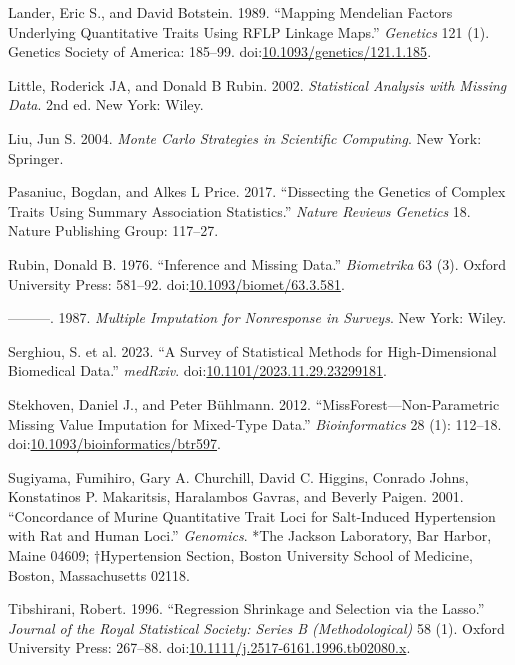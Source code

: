 \documentclass[
  12pt,
]{article}
\newlength{\cslhangindent}
\newlength{\cslentryspacingunit} %
\newenvironment{CSLReferences}[2] %
 {%
  \setlength{\parindent}{0pt}
  \ifodd #1
  \let\oldpar\par
  \def\par{\hangindent=\cslhangindent\oldpar}
  \fi
  \setlength{\parskip}{#2\cslentryspacingunit}
 }%
 {}
\begin{document}
\begin{CSLReferences}{1}{0}
\leavevmode{}%
Lander, Eric S., and David Botstein. 1989. {``Mapping Mendelian Factors
Underlying Quantitative Traits Using RFLP Linkage Maps.''}
\emph{Genetics} 121 (1). Genetics Society of America: 185--99.
doi:\href{https://doi.org/10.1093/genetics/121.1.185}{10.1093/genetics/121.1.185}.

\leavevmode{}%
Little, Roderick JA, and Donald B Rubin. 2002. \emph{Statistical
Analysis with Missing Data}. 2nd ed. New York: Wiley.

\leavevmode{}%
Liu, Jun S. 2004. \emph{Monte Carlo Strategies in Scientific Computing}.
New York: Springer.

\leavevmode{}%
Pasaniuc, Bogdan, and Alkes L Price. 2017. {``Dissecting the Genetics of
Complex Traits Using Summary Association Statistics.''} \emph{Nature
Reviews Genetics} 18. Nature Publishing Group: 117--27.

\leavevmode{}%
Rubin, Donald B. 1976. {``Inference and Missing Data.''}
\emph{Biometrika} 63 (3). Oxford University Press: 581--92.
doi:\href{https://doi.org/10.1093/biomet/63.3.581}{10.1093/biomet/63.3.581}.

\leavevmode{}%
---------. 1987. \emph{Multiple Imputation for Nonresponse in Surveys}.
New York: Wiley.

\leavevmode{}%
Serghiou, S. et al. 2023. {``A Survey of Statistical Methods for
High-Dimensional Biomedical Data.''} \emph{medRxiv}.
doi:\href{https://doi.org/10.1101/2023.11.29.23299181}{10.1101/2023.11.29.23299181}.

\leavevmode{}%
Stekhoven, Daniel J., and Peter Bühlmann. 2012.
{``MissForest---Non-Parametric Missing Value Imputation for Mixed-Type
Data.''} \emph{Bioinformatics} 28 (1): 112--18.
doi:\href{https://doi.org/10.1093/bioinformatics/btr597}{10.1093/bioinformatics/btr597}.

\leavevmode{}%
Sugiyama, Fumihiro, Gary A. Churchill, David C. Higgins, Conrado Johns,
Konstatinos P. Makaritsis, Haralambos Gavras, and Beverly Paigen. 2001.
{``Concordance of Murine Quantitative Trait Loci for Salt-Induced
Hypertension with Rat and Human Loci.''} \emph{Genomics}. *The Jackson
Laboratory, Bar Harbor, Maine 04609; †Hypertension Section, Boston
University School of Medicine, Boston, Massachusetts 02118.

\leavevmode{}%
Tibshirani, Robert. 1996. {``Regression Shrinkage and Selection via the
Lasso.''} \emph{Journal of the Royal Statistical Society: Series B
(Methodological)} 58 (1). Oxford University Press: 267--88.
doi:\href{https://doi.org/10.1111/j.2517-6161.1996.tb02080.x}{10.1111/j.2517-6161.1996.tb02080.x}.

\end{CSLReferences}
\end{document}
